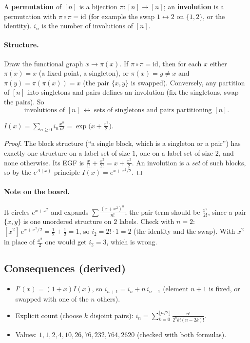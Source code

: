 \documentclass[11pt]{article}
\begin{document}
A \textbf{permutation} of $[n]$ is a bijection $\pi:[n]\to[n]$; an \textbf{involution} is a permutation with $\pi\circ\pi=\mathrm{id}$ (for example the swap $1\leftrightarrow2$ on $\{1,2\}$, or the identity). $i_n$ is the number of involutions of $[n]$.

\paragraph{Structure.} Draw the functional graph $x\to\pi(x)$. If $\pi\circ\pi=\mathrm{id}$, then for each $x$ either $\pi(x)=x$ (a fixed point, a singleton), or $\pi(x)=y\ne x$ and $\pi(y)=\pi(\pi(x))=x$ (the pair $\{x,y\}$ is swapped). Conversely, any partition of $[n]$ into singletons and pairs defines an involution (fix the singletons, swap the pairs). So
\[
\text{involutions of }[n]\ \longleftrightarrow\ \text{sets of singletons and pairs partitioning }[n].
\]

\begin{theorem}
$I(x)=\sum_{n\ge0}i_n\frac{x^n}{n!}=\exp\!\bigl(x+\tfrac{x^2}2\bigr)$.
\end{theorem}
\begin{proof}
The block structure (``a single block, which is a singleton or a pair'') has exactly one structure on a label set of size $1$, one on a label set of size $2$, and none otherwise. Its EGF is $\frac{x}{1!}+\frac{x^2}{2!}=x+\frac{x^2}2$. An involution is a \emph{set} of such blocks, so by the $e^{A(x)}$ principle $I(x)=e^{x+x^2/2}$.
\end{proof}

\paragraph{Note on the board.} It circles $e^{x+x^2}$ and expands $\sum\frac{(x+x^2)^n}{n!}$; the pair term should be $\frac{x^2}{2!}$, since a pair $\{x,y\}$ is one unordered structure on $2$ labels. Check with $n=2$: $[x^2]\,e^{x+x^2/2}=\frac12+\frac12=1$, so $i_2=2!\cdot1=2$ (the identity and the swap). With $x^2$ in place of $\frac{x^2}2$ one would get $i_2=3$, which is wrong.

\subsection*{Consequences (derived)}
\begin{itemize}[nosep]
  \item $I'(x)=(1+x)I(x)$, so $i_{n+1}=i_n+n\,i_{n-1}$ (element $n+1$ is fixed, or swapped with one of the $n$ others).
  \item Explicit count (choose $k$ disjoint pairs): $i_n=\displaystyle\sum_{k=0}^{\lfloor n/2\rfloor}\frac{n!}{2^kk!(n-2k)!}$.
  \item Values: $1,1,2,4,10,26,76,232,764,2620$ (checked with both formulas).
\end{itemize}
\end{document}
